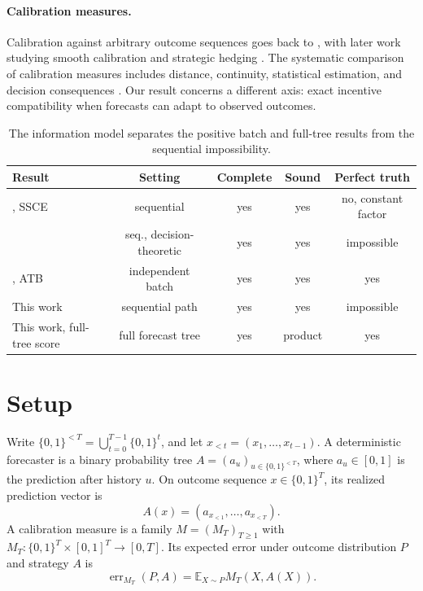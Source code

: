\documentclass{article}
\theoremstyle{definition}
\theoremstyle{remark}
\newcommand{\E}{\mathbb E}
\newcommand{\1}{\mathbf 1}
\begin{document}
\paragraph{Calibration measures.} Calibration against arbitrary outcome sequences goes back to \citet{foster1998asymptotic}, with later work studying smooth calibration and strategic hedging \citep{kakade2008deterministic,foster2021hedging}. The systematic comparison of calibration measures includes distance, continuity, statistical estimation, and decision consequences \citep{blasiok2023unifying}. Our result concerns a different axis: exact incentive compatibility when forecasts can adapt to observed outcomes.

\begin{table}[t]
\centering
\footnotesize \setlength{\tabcolsep}{3pt}
\begin{tabular}{@{}lcccc@{}}
\toprule
Result & Setting & Complete & Sound & Perfect truth \\
\midrule
\citet{haghtalab2024truthfulness}, SSCE & sequential & yes & yes & no, constant factor \\
\citet{qiao2025decision} & seq., decision-theoretic & yes & yes & impossible \\
\citet{hartline2026perfect}, ATB & independent batch & yes & yes & yes \\
This work & sequential path & yes & yes & impossible \\
This work, full-tree score & full forecast tree & yes & product & yes \\
\bottomrule
\end{tabular}
\caption{The information model separates the positive batch and full-tree results from the sequential impossibility.}
\label{tab:comparison}
\end{table}

\section{Setup}

Write \(\{0,1\}^{<T}=\bigcup_{t=0}^{T-1}\{0,1\}^t\), and let \(x_{<t}=(x_1,\ldots,x_{t-1})\). A deterministic forecaster is a binary probability tree \(A=(a_u)_{u\in\{0,1\}^{<T}}\), where \(a_u\in[0,1]\) is the prediction after history \(u\). On outcome sequence \(x\in\{0,1\}^T\), its realized prediction vector is \[ A(x)=(a_{x_{<1}},\ldots,a_{x_{<T}}). \] A calibration measure is a family \(M=(M_T)_{T\ge1}\) with \(M_T:\{0,1\}^T\times[0,1]^T\to[0,T]\). Its expected error under outcome distribution \(P\) and strategy \(A\) is \[ \operatorname{err}_{M_T}(P,A)=\E_{X\sim P}M_T(X,A(X)). \]
\end{document}
